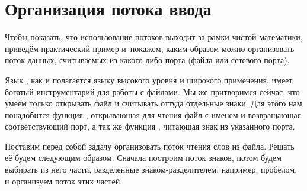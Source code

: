 \section{Организация потока ввода}%
Чтобы показать, что использование потоков выходит за рамки чистой математики, приведём практический пример и~покажем, каким образом можно организовать поток данных, считываемых из какого-либо порта (файла или сетевого порта).

Язык \Scheme, как и полагается языку высокого уровня и широкого применения, имеет богатый инструментарий для работы с файлами. Мы же притворимся сейчас, что умеем только открывать файл и считывать оттуда отдельные знаки. Для этого нам понадобится функция , открывающая для чтения файл с именем  и возвращающая соответствующий порт, а так же функция , читающая знак из указанного порта. 

Поставим перед собой задачу организовать поток чтения слов из файла. Решать её будем следующим образом. Сначала построим поток знаков, потом будем выбирать из него части, разделенные знаком-разделителем, например, пробелом, и организуем поток этих частей.

